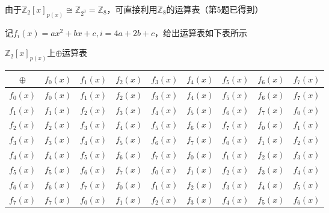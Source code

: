 \begin{Solution}
    由于$\mathbb{Z}_2[x]_{p(x)}\cong\mathbb{Z}_{2^3} = \mathbb{Z}_{8}$，可直接利用$\mathbb{Z}_{8}$的运算表（第5题已得到）
    
    记$f_i(x) = ax^2+bx+c, i = 4a + 2b + c$，给出运算表如下表所示
    
        \centering
        \makeatletter{}\makeatother\caption{$\mathbb{Z}_2[x]_{p(x)}$上$\oplus$运算表}
        \begin{tabular}{|c|c|c|c|c|c|c|c|c|}
        \hline
        $\oplus$  & $f_0(x)$ &  $f_1(x)$  & $f_2(x)$  & $f_3(x)$  & $f_4(x)$  & $f_5(x)$  & $f_6(x)$  & $f_7(x)$\\ \hline
        $f_0(x)$  & $f_0(x)$ &  $f_1(x)$  & $f_2(x)$  & $f_3(x)$  & $f_4(x)$  & $f_5(x)$  & $f_6(x)$  & $f_7(x)$\\ \hline
        $f_1(x)$  & $f_1(x)$ &  $f_2(x)$  & $f_3(x)$  & $f_4(x)$  & $f_5(x)$  & $f_6(x)$  & $f_7(x)$  & $f_0(x)$\\ \hline
        $f_2(x)$  & $f_2(x)$ &  $f_3(x)$  & $f_4(x)$  & $f_5(x)$  & $f_6(x)$  & $f_7(x)$  & $f_0(x)$  & $f_1(x)$\\ \hline
        $f_3(x)$  & $f_3(x)$ &  $f_4(x)$  & $f_5(x)$  & $f_6(x)$  & $f_7(x)$  & $f_0(x)$  & $f_1(x)$  & $f_2(x)$\\ \hline
        $f_4(x)$  & $f_4(x)$ &  $f_5(x)$  & $f_6(x)$  & $f_7(x)$  & $f_0(x)$  & $f_1(x)$  & $f_2(x)$  & $f_3(x)$\\ \hline
        $f_5(x)$  & $f_5(x)$ &  $f_6(x)$  & $f_7(x)$  & $f_0(x)$  & $f_1(x)$  & $f_2(x)$  & $f_3(x)$  & $f_4(x)$\\ \hline
        $f_6(x)$  & $f_6(x)$ &  $f_7(x)$  & $f_0(x)$  & $f_1(x)$  & $f_2(x)$  & $f_3(x)$  & $f_4(x)$  & $f_5(x)$\\ \hline
        $f_7(x)$  & $f_7(x)$ &  $f_0(x)$  & $f_1(x)$  & $f_2(x)$  & $f_3(x)$  & $f_4(x)$  & $f_5(x)$  & $f_6(x)$\\ \hline
        \end{tabular}


\end{Solution}
